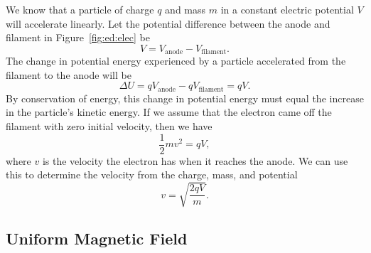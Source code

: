 We know that a particle of charge $q$ and mass $m$ in a constant electric 
potential $V$ will accelerate linearly.  Let the potential difference between 
the anode and filament in Figure~\ref{fig:ed:elec} be
$$V = V_{\mbox{anode}}- V_{\mbox{filament}}.$$  
The change in potential energy experienced by a particle accelerated  
from the filament to the anode will be
$$\Delta U = q V_{\mbox{anode}} - q V_{\mbox{filament}} = qV.$$
By conservation of energy, this change in potential energy must equal the
increase in the particle's kinetic energy.  If we assume that the electron
came off the filament with zero initial velocity, then we have
$$\frac{1}{2} m v^2 = qV,$$
where $v$ is the velocity the electron has when it reaches the anode.
We can use this to determine the velocity from the charge, mass, and 
potential
\begin{equation}
v=\sqrt{\frac{2qV}{m}}. \label{eq:ed:velocity}
\end{equation}

\subsection{Uniform Magnetic Field}

